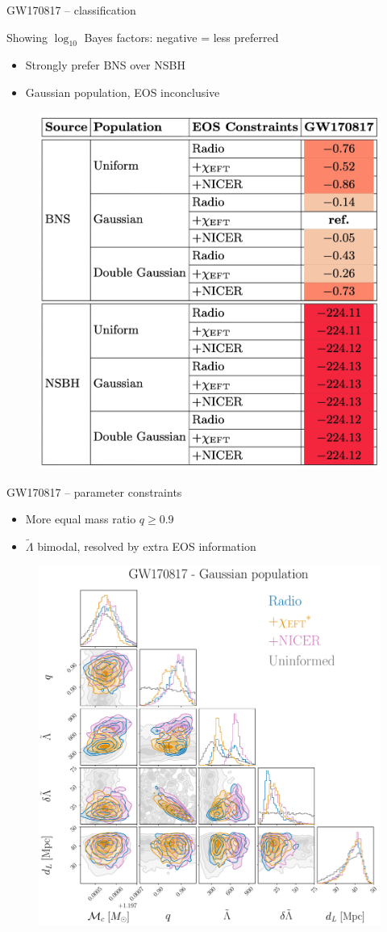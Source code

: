 \documentclass[usenames,dvipsnames,t]{beamer}
\begin{document}
\begin{frame}{GW170817 -- classification}

  Showing $\log_{10}$ Bayes factors: negative = less preferred

  \begin{itemize}
    \item Strongly prefer BNS over NSBH
    \item Gaussian population, EOS inconclusive
  \end{itemize}
  \begin{figure}
    \centering
    \includegraphics[width=0.50\linewidth]{Figures/GW170817_EOS_source_classification.jpg}
  \end{figure}
  
\end{frame}

\begin{frame}{GW170817 -- parameter constraints}

  \begin{itemize}
    \item More equal mass ratio $q\geq 0.9$
    \item $\tilde{\Lambda}$ bimodal, resolved by extra EOS information
  \end{itemize}

  \begin{figure}
    \centering
    \includegraphics[width=0.525\linewidth]{Figures/GW170817_corner_gaussian_bns_PRESENTATION.pdf}
  \end{figure}
\end{frame}
\end{document}
